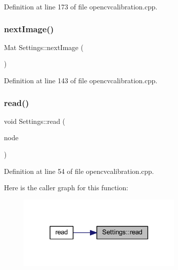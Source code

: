 Definition at line 173 of file opencvcalibration.\+cpp.

\mbox{\label{classSettings_a7701462e928f2425b342440fba9973e5}} 
\subsubsection{\texorpdfstring{nextImage()}{nextImage()}}
{\footnotesize\ttfamily Mat Settings\+::next\+Image (\begin{DoxyParamCaption}{ }\end{DoxyParamCaption})\hspace{0.3cm}{\ttfamily [inline]}}



Definition at line 143 of file opencvcalibration.\+cpp.

\mbox{\label{classSettings_a2d7841f8441095032e0f3b7d20adfd3f}} 
\subsubsection{\texorpdfstring{read()}{read()}}
{\footnotesize\ttfamily void Settings\+::read (\begin{DoxyParamCaption}\item[{const File\+Node \&}]{node }\end{DoxyParamCaption})\hspace{0.3cm}{\ttfamily [inline]}}



Definition at line 54 of file opencvcalibration.\+cpp.

Here is the caller graph for this function\+:
\nopagebreak
\begin{figure}[H]
\begin{center}
\leavevmode
\includegraphics[width=228pt]{classSettings_a2d7841f8441095032e0f3b7d20adfd3f_icgraph}
\end{center}
\end{figure}
\mbox{\label{classSettings_ae57696cead99c4f0c528e33793866457}} 
